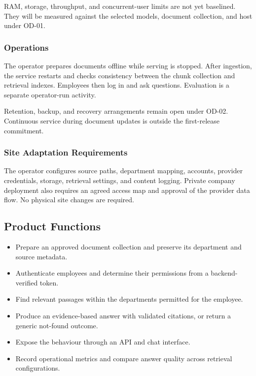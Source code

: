 \documentclass[11pt,letterpaper]{article}
\begin{document}
RAM, storage, throughput, and concurrent-user limits are not yet baselined. They will be measured against the selected models, document collection, and host under OD-01.\par

\subsubsection{Operations}

The operator prepares documents offline while serving is stopped. After ingestion, the service restarts and checks consistency between the chunk collection and retrieval indexes. Employees then log in and ask questions. Evaluation is a separate operator-run activity.\par

Retention, backup, and recovery arrangements remain open under OD-02. Continuous service during document updates is outside the first-release commitment.\par

\subsubsection{Site Adaptation Requirements}

The operator configures source paths, department mapping, accounts, provider credentials, storage, retrieval settings, and content logging. Private company deployment also requires an agreed access map and approval of the provider data flow. No physical site changes are required.\par

\subsection{Product Functions}

\begin{itemize}

\item Prepare an approved document collection and preserve its department and source metadata.

\item Authenticate employees and determine their permissions from a backend-verified token.

\item Find relevant passages within the departments permitted for the employee.

\item Produce an evidence-based answer with validated citations, or return a generic not-found outcome.

\item Expose the behaviour through an API and chat interface.

\item Record operational metrics and compare answer quality across retrieval configurations.

\end{itemize}
\end{document}
